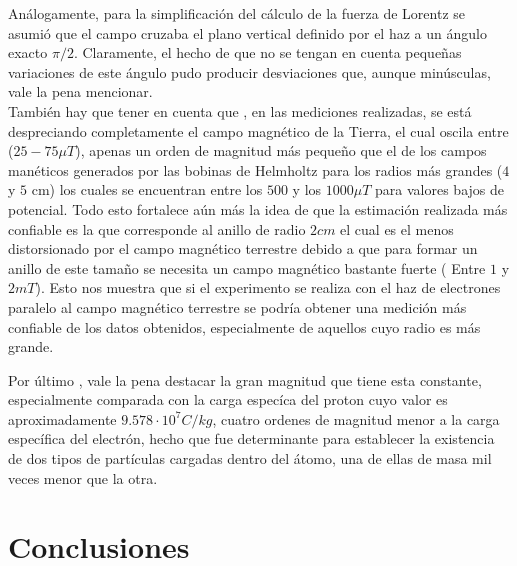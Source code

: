 \documentclass[prb,aps,twocolumn,preprintnumbers,amsmath,amssymb]{revtex4}
\begin{document}
Análogamente, para la simplificación del cálculo de la fuerza de Lorentz se asumió que el campo cruzaba el plano vertical definido por el haz a un ángulo exacto $ \pi /2 $. Claramente, el hecho de que no se tengan en cuenta pequeñas variaciones de este ángulo pudo producir desviaciones que, aunque minúsculas, vale la pena mencionar. \\

También hay que tener en cuenta que , en las mediciones realizadas, se está despreciando completamente el campo magnético de la Tierra, el cual oscila entre ($25-75 \mu T$), apenas un orden de magnitud más pequeño que el de los campos manéticos generados por las bobinas de Helmholtz para los radios más grandes ($4$ y $5$ cm) los cuales se encuentran entre los $500$ y los $1000 \mu T$ para valores bajos de potencial. Todo esto fortalece aún más la idea de que la estimación realizada más confiable es la que corresponde al anillo de radio $2cm$ el cual  es el menos distorsionado por el campo magnético terrestre debido a que para formar un anillo de este tamaño se necesita un campo magnético bastante fuerte ( Entre $1$ y $2 mT$). Esto nos muestra que si el experimento se realiza con el haz de electrones paralelo al campo magnético terrestre se podría obtener una medición más confiable de los datos obtenidos, especialmente de aquellos cuyo radio es más grande. 

Por último , vale la pena destacar la gran magnitud que tiene esta constante, especialmente comparada con la carga especíca del proton cuyo valor es aproximadamente $9.578 \cdot 10^7 C/kg$, cuatro ordenes de magnitud menor a la carga específica del electrón, hecho que fue determinante para establecer la existencia de dos tipos de partículas cargadas dentro del átomo, una de ellas de masa mil veces menor que la otra.\\


\section{Conclusiones}
\end{document}
